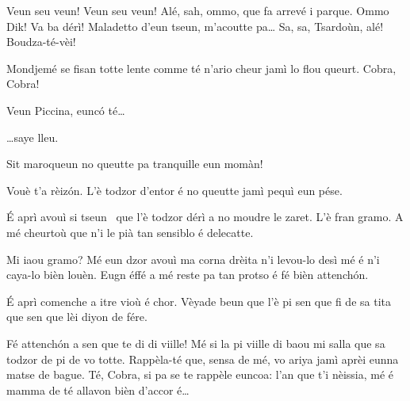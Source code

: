 
\begin{drama}

\Sahlammspeaks Veun seu veun! Veun seu veun! Alé, sah, ommo, que fa arrevé i parque. Ommo Dik! Va ba dérì! Maladetto d'eun tseun, m'acoutte pa\ldots 
Sa, sa, Tsardoùn, alé! Boudza-té-vèi!


\Sahlammspeaks Mondjemé se fisan totte lente comme té n’ario cheur jamì lo flou queurt. Cobra, Cobra!


\Sahlammspeaks Veun Piccina, eunc\'o té\ldots


\Sahlammspeaks \ldots saye lleu.


\Piccinaspeaks Sit maroqueun no queutte pa tranquille eun momàn!

\Cobraspeaks  Vouè t’a rèiz\'on. L’è todzor d’entor é no queutte jamì pequì eun pése.

\Tzardounspeaks \'E aprì avouì si tseun \cane\ que l’è todzor dérì a no moudre le zaret. L’è fran gramo. A mé cheurtoù que n’i le pià tan sensiblo é delecatte.

\Cobraspeaks Mi iaou gramo? Mé eun dzor avouì ma corna drèita n’i levou-lo desì mé é n'i caya-lo bièn louèn.  Eugn éffé a mé reste pa tan protso é fé bièn attench\'on.

\Piccinaspeaks \'E aprì comenche a itre vioù é chor. Vèyade beun que l’è pi sen que fi de sa tita que sen que lèi diyon de fére.

\Tzardounspeaks Fé attench\'on a sen que te di di viille! Mé si la pi viille di baou mi salla que sa todzor de pi de vo totte. Rappèla-té que, sensa de mé, vo ariya jamì aprèi eunna matse de bague. Té, Cobra, si pa se te rappèle euncoa: l’an que t’i nèissia, mé é mamma de té allavon bièn d’accor é\ldots


\end{drama}
